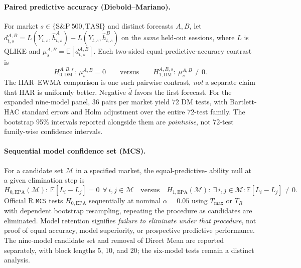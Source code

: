 \paragraph{Paired predictive accuracy (Diebold--Mariano).}
For market $s\in\{\mathrm{S\&P\ 500},\mathrm{TASI}\}$ and distinct forecasts
$A,B$, let $d_{t,s}^{A,B}=L(Y_{t,s},\widehat h^A_{t,s})-
L(Y_{t,s},\widehat h^B_{t,s})$ on the \emph{same} held-out sessions,
where $L$ is QLIKE and $\mu_s^{A,B}=\mathbb E[d_{t,s}^{A,B}]$.
Each two-sided equal-predictive-accuracy contrast is
\begin{equation}\label{eq:study2_h0_dm}
H_{0,\mathrm{DM}}^{A,B,s}:\ \mu_s^{A,B}=0
\qquad\text{versus}\qquad
H_{1,\mathrm{DM}}^{A,B,s}:\ \mu_s^{A,B}\neq 0.
\end{equation}
The HAR--EWMA comparison is one such pairwise contrast, \emph{not} a separate
claim that HAR is uniformly better. Negative $\overline d$ favors the first
forecast. For the expanded nine-model panel, 36 pairs per market yield 72
DM tests, with Bartlett-HAC standard errors and Holm adjustment over the entire
72-test family. The bootstrap 95\% intervals reported alongside them are
\emph{pointwise}, not 72-test family-wise confidence intervals.

\paragraph{Sequential model confidence set (MCS).}
For a candidate set $\mathcal M$ in a specified market, the equal-predictive-
ability null at a given elimination step is
\begin{equation}\label{eq:study2_h0_mcs}
H_{0,\mathrm{EPA}}(\mathcal M):\
\mathbb E[L_i-L_j]=0\ \ \forall\,i,j\in\mathcal M
\quad\text{versus}\quad
H_{1,\mathrm{EPA}}(\mathcal M):\
\exists\,i,j\in\mathcal M:\mathbb E[L_i-L_j]\neq0.
\end{equation}
Official R \texttt{MCS} tests $H_{0,\mathrm{EPA}}$ sequentially at nominal
$\alpha=0.05$ using $T_{\max}$ or $T_R$ with dependent bootstrap resampling,
repeating the procedure as candidates are eliminated. Model retention signifies
\emph{failure to eliminate under that procedure}, not proof of equal accuracy,
model superiority, or prospective predictive performance. The nine-model
candidate set and removal of Direct Mean are reported separately, with block
lengths 5, 10, and 20; the six-model tests remain a distinct analysis.

